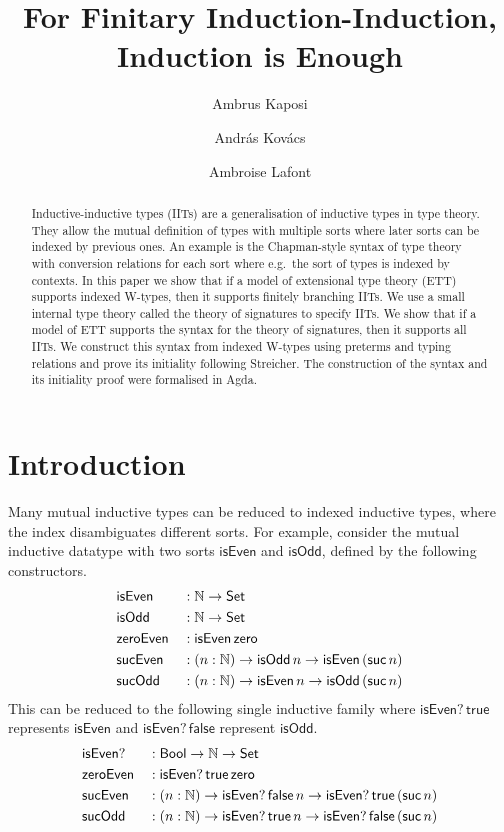 \documentclass[a4paper,UKenglish,cleveref, autoref]{lipics-v2019}
\title{For Finitary Induction-Induction, \\ Induction is Enough} %
\author{Ambrus Kaposi}{E{\"o}tv{\"o}s Lor{\'a}nd University, Budapest, Hungary}{akaposi@inf.elte.hu}{https://orcid.org/0000-0001-9897-8936}{this author was supported by the National Research,
Development and Innovation Fund of Hungary, financed under the
Thematic Excellence Programme funding scheme, Project
no.\ ED\_18-1-2019-0030, by the New National Excellence Program of the Ministry
for Innovation and Technology, Project no.\ ÚNKP-19-4-ELTE-874, and
by the Bolyai Fellowship of the Hungarian Academy of Sciences,
Project no.\ BO/00659/19/3.}%
\author{Andr{\'a}s Kov{\'a}cs}{E{\"o}tv{\"o}s Lor{\'a}nd University, Budapest, Hungary}{kovacsandras@inf.elte.hu}{https://orcid.org/0000-0002-6375-9781}{this author was supported by the European Union, co-financed by the European Social Fund (EFOP-3.6.3-VEKOP-16-2017-00002).}
\author{Ambroise Lafont}{IMT Atlantique, Inria, LS2N CNRS, Nantes, France}{ambroise.lafont@gmail.com}{https://orcid.org/0000-0002-9299-641X}{this author was supported by the CoqHoTT ERC Grant 637339.}
\begin{document}
\maketitle

\begin{abstract}
  Inductive-inductive types (IITs) are a generalisation of inductive
  types in type theory. They allow the mutual definition of types with
  multiple sorts where later sorts can be indexed by previous ones. An
  example is the Chapman-style syntax of type theory with conversion
  relations for each sort where e.g.\ the sort of types is indexed by
  contexts. In this paper we show that if a model of extensional type
  theory (ETT) supports indexed W-types, then it supports finitely
  branching IITs. We use a small internal type theory called the
  theory of signatures to specify IITs. We show that if a model of ETT
  supports the syntax for the theory of signatures, then it supports
  all IITs. We construct this syntax from indexed W-types using
  preterms and typing relations and prove its initiality following
  Streicher. The construction of the syntax and its initiality proof
  were formalised in Agda.
\end{abstract}


\section{Introduction}
\label{sec:intro}

Many mutual inductive types can be reduced to indexed inductive types, where the
index disambiguates different sorts. For example, consider the mutual inductive datatype
with two sorts
$\mathsf{isEven}$ and $\mathsf{isOdd}$, defined by the following
constructors.
\begin{alignat*}{5}
  & \mathsf{isEven} && : \mathbb{N}\rightarrow\mathsf{Set} \\
  & \mathsf{isOdd} && : \mathbb{N}\rightarrow \mathsf{Set} \\
  & \mathsf{zeroEven} && : \mathsf{isEven}\,\mathsf{zero} \\
  & \mathsf{sucEven} && : (n:\mathbb{N})\rightarrow\mathsf{isOdd}\,n\rightarrow\mathsf{isEven}\,(\mathsf{suc}\,n) \\
  & \mathsf{sucOdd} && : (n:\mathbb{N})\rightarrow\mathsf{isEven}\,n\rightarrow\mathsf{isOdd}\,(\mathsf{suc}\,n)
\end{alignat*}
This can be reduced to the following single inductive family where
$\mathsf{isEven?}\,\mathsf{true}$ represents $\mathsf{isEven}$ and
$\mathsf{isEven?}\,\mathsf{false}$ represent $\mathsf{isOdd}$.
\begin{alignat*}{5}
  & \mathsf{isEven?} && : \mathsf{Bool}\rightarrow\mathbb{N}\rightarrow\mathsf{Set} \\
  & \mathsf{zeroEven} && : \mathsf{isEven?}\,\mathsf{true}\,\mathsf{zero} \\
  & \mathsf{sucEven} && : (n:\mathbb{N})\rightarrow\mathsf{isEven?}\,\mathsf{false}\,n\rightarrow\mathsf{isEven?}\,\mathsf{true}\,(\mathsf{suc}\,n) \\
  & \mathsf{sucOdd} && : (n:\mathbb{N})\rightarrow\mathsf{isEven?}\,\mathsf{true}\,n\rightarrow\mathsf{isEven?}\,\mathsf{false}\,(\mathsf{suc}\,n)
\end{alignat*}
\end{document}
